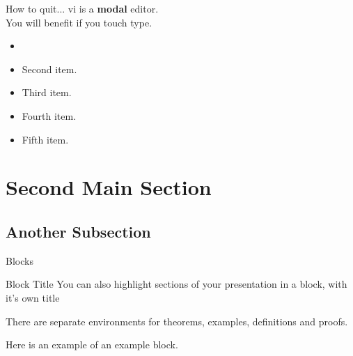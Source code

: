 \documentclass{beamer}
\begin{document}
\begin{frame}{How to quit...}%
vi is a \textbf{modal} editor. \\
You will benefit if you touch type.\\
	\begin{itemize}
		\item {
				
			}
		\item {   
			Second item.
			}
		\item {
			Third item.
			}
		\item {
				Fourth item.
			}
		\item {
				Fifth item. %
			}
	\end{itemize}
\end{frame}

\section{Second Main Section}

\subsection{Another Subsection}

\begin{frame}{Blocks}
	\begin{block}{Block Title}
		You can also highlight sections of your presentation in a block, with it's own title
	\end{block}
	\begin{theorem}
		There are separate environments for theorems, examples, definitions and proofs.
	\end{theorem}
	\begin{example}
		Here is an example of an example block.
	\end{example}
\end{frame}

\end{document}
